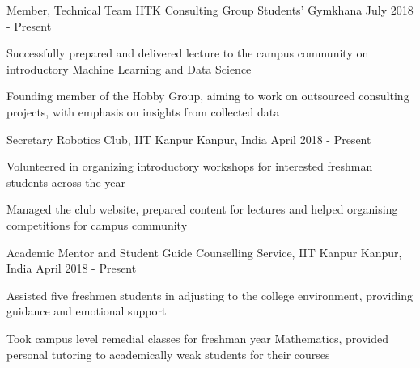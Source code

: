 \begin{cventries}

 \cventry
    {Member, Technical Team}
    {IITK Consulting Group}
    {Students' Gymkhana} 
    {July 2018 - Present}
    {
      \begin{cvitems}
        \item {Successfully prepared and delivered lecture to the campus community on introductory Machine Learning and Data Science}
        \item {Founding member of the Hobby Group, aiming to work on outsourced consulting projects, with emphasis on insights from collected data}
      \end{cvitems}
    }

  \cventry
    {Secretary}
    {Robotics Club, IIT Kanpur}
    {Kanpur, India} 
    {April 2018 - Present} 
    {
      \begin{cvitems}
        \item {Volunteered in organizing introductory workshops for interested freshman students across the year}
        \item{Managed the club website, prepared content for lectures and helped organising competitions for campus community}
        \end{cvitems}
    }

  \cventry
    {Academic Mentor and Student Guide}
    {Counselling Service, IIT Kanpur}
    {Kanpur, India}
    {April 2018 - Present}
    {
      \begin{cvitems} %
        \item {Assisted five freshmen students in adjusting to the college environment, providing guidance and emotional support}
        \item{Took campus level remedial classes for freshman year Mathematics, provided personal tutoring to academically weak students for their courses}
      \end{cvitems}
    }

\end{cventries}
